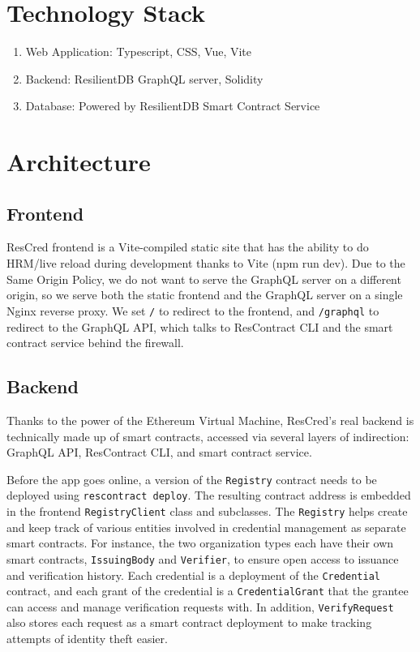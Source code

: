\section{Technology Stack}
\begin{enumerate}
    \item Web Application: Typescript, CSS, Vue, Vite 
    \item Backend: ResilientDB GraphQL server, Solidity
    \item Database: Powered by ResilientDB Smart Contract Service
\end{enumerate}

\section{Architecture}

\subsection{Frontend}

ResCred frontend is a Vite-compiled static site that has the ability to do HRM/live reload during development thanks to Vite (npm run dev). Due to the Same Origin Policy, we do not want to serve the GraphQL server on a different origin, so we serve both the static frontend and the GraphQL server on a single Nginx reverse proxy. 
We set \verb|/| to redirect to the frontend, and \verb|/graphql| to redirect to the GraphQL API,
which talks to ResContract CLI and the smart contract service behind the firewall.

\subsection{Backend}

Thanks to the power of the Ethereum Virtual Machine, ResCred’s real backend is technically made up of smart contracts, accessed via several layers of indirection: GraphQL API, ResContract CLI, and smart contract service.

Before the app goes online, a version of the \verb|Registry| contract needs to be deployed using
\verb|rescontract deploy|. The resulting contract address is embedded in the frontend
\verb|RegistryClient| class and subclasses. The \verb|Registry| helps create and keep track of
various entities involved in credential management as separate smart contracts. For instance, the
two organization types each have their own smart contracts, \verb|IssuingBody| and \verb|Verifier|,
to ensure open access to issuance and verification history. Each credential is a deployment of the
\verb|Credential| contract, and each grant of the credential is a \verb|CredentialGrant| that the
grantee can access and manage verification requests with. In addition, \verb|VerifyRequest| also stores each request as a smart contract deployment to make tracking attempts of identity theft easier.

